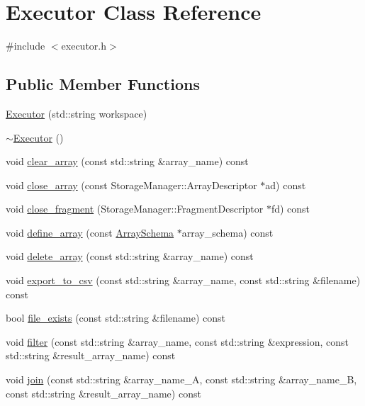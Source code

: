 \hypertarget{classExecutor}{}\section{Executor Class Reference}
\label{classExecutor}


{\ttfamily \#include $<$executor.\+h$>$}

\subsection*{Public Member Functions}
\begin{DoxyCompactItemize}
\item 
\hyperlink{classExecutor_a5ea6a42d8c97cb71e5720830af349954}{Executor} (std\+::string workspace)
\item 
\hyperlink{classExecutor_a23108c89c4a25e22c927115191c04b26}{$\sim$\+Executor} ()
\item 
void \hyperlink{classExecutor_a45648f4d114834e3f1abac2d3b89c580}{clear\+\_\+array} (const std\+::string \&array\+\_\+name) const 
\item 
void \hyperlink{classExecutor_a4f9429d0df8f4fb4b055ac9a775527b7}{close\+\_\+array} (const Storage\+Manager\+::\+Array\+Descriptor $\ast$ad) const 
\item 
void \hyperlink{classExecutor_a6adf42d9015146cb8cd8d0b7c8911597}{close\+\_\+fragment} (Storage\+Manager\+::\+Fragment\+Descriptor $\ast$fd) const 
\item 
void \hyperlink{classExecutor_adb431db3659ae76d9d308fa135b73a5e}{define\+\_\+array} (const \hyperlink{classArraySchema}{Array\+Schema} $\ast$array\+\_\+schema) const 
\item 
void \hyperlink{classExecutor_a5abf0d9cee895dfec60d701c0bc93599}{delete\+\_\+array} (const std\+::string \&array\+\_\+name) const 
\item 
void \hyperlink{classExecutor_af2e63010bb79b43baa8a2cbe60dfd961}{export\+\_\+to\+\_\+csv} (const std\+::string \&array\+\_\+name, const std\+::string \&filename) const 
\item 
bool \hyperlink{classExecutor_a1c0486a017c19e392e2a14f4050374f5}{file\+\_\+exists} (const std\+::string \&filename) const 
\item 
void \hyperlink{classExecutor_a164b2b522121abae3a0adc5da5e035f3}{filter} (const std\+::string \&array\+\_\+name, const std\+::string \&expression, const std\+::string \&result\+\_\+array\+\_\+name) const 
\item 
void \hyperlink{classExecutor_a6867550d21cbde880c10f114f3920f79}{join} (const std\+::string \&array\+\_\+name\+\_\+\+A, const std\+::string \&array\+\_\+name\+\_\+\+B, const std\+::string \&result\+\_\+array\+\_\+name) const 

\end{DoxyCompactItemize}
